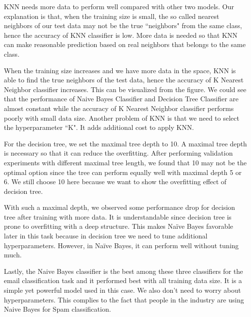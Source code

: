 \documentclass[twoside,11pt]{homework}
\begin{document}
KNN needs more data to perform well compared with other two models. Our explanation is that, when the training size is small, the so called nearest neighbors of our test data may not be the true ``neighbors" from the same class, hence the accuracy of KNN classifier is low. More data is needed so that KNN can make reasonable prediction based on real neighbors that belongs to the same class.

When the training size increases and we have more data in the space, KNN is able to find the true neighbors of the test data, hence the accuracy of K Nearest Neighbor classifier increases. This can be visualized from the figure. We could see that the performance of Naive Bayes Classifier and Decision Tree Classifier are almost constant while the accuracy of K Nearest Neighbor classifier performs poorly with small data size. 
Another problem of KNN is that we need to select the hyperparameter ``K". It adds additional cost to apply KNN. 

For the decision tree, we set the maximal tree depth to 10. A maximal tree depth is necessary so that it can reduce the overfitting. After performing validation experiments with different maximal tree length, we found that 10 may not be the optimal option since the tree can perform equally well with maximal depth 5 or 6. We still choose 10 here because we want to show the overfitting effect of decision tree. 

With such a maximal depth, we observed some performance drop for decision tree after training with more data. It is understandable since decision tree is prone to overfitting with a deep structure. This makes Naïve Bayes favorable later in this task because in decision tree we need to tune additional hyperparameters. However, in Naïve Bayes, it can perform well without tuning much. 

Lastly, the Naive Bayes classifier is the best among these three classifiers for the email classification task and it performed best with all training data size. It is a simple yet powerful model used in this case. We also don't need to worry about hyperparameters.
This complies to the fact that people in the industry are using Naive Bayes for Spam classification.
\end{document}
